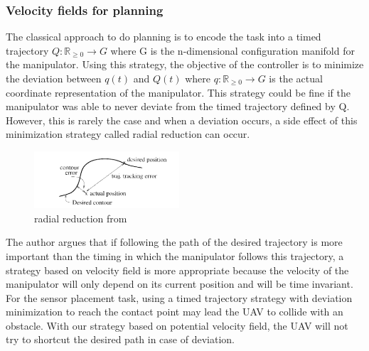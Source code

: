 \subsubsection{Velocity fields for planning}
The classical approach to do planning is to encode the task into a timed trajectory $Q:\mathbb R_{\ge 0} \rightarrow G$ where G is the n-dimensional configuration manifold for the manipulator.
Using this strategy, the objective of the controller is to minimize the deviation between $q(t)$ and $Q(t)$ where $q:\mathbb R_{\ge 0} \rightarrow G$ is the actual coordinate representation of the manipulator.
This strategy could be fine if the manipulator was able to never deviate from the timed trajectory defined by Q. However, this is rarely the case and when a deviation occurs, a side effect of this minimization strategy called radial reduction can occur.
\begin{figure}[h!]
    \centering
    \includegraphics[width=0.48\textwidth]{Images/radialreduction.png}
    \caption{radial reduction from \cite{li1999passive}}
    \label{fig:radialreduction}
\end{figure} 
The author argues that if following the path of the desired trajectory is more important than the timing in which the manipulator follows this trajectory, a strategy based on velocity field is more appropriate because the velocity of the manipulator will only depend on its current position and will be time invariant.  
For the sensor placement task, using a timed trajectory strategy with deviation minimization to reach the contact point may lead the UAV to collide with an obstacle. With our strategy based on potential velocity field, the UAV will not try to shortcut the desired path in case of deviation.


